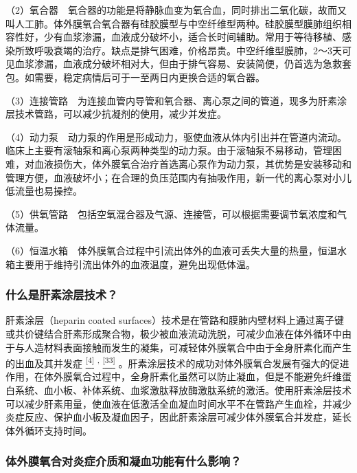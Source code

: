 （2）氧合器　氧合器的功能是将静脉血变为氧合血，同时排出二氧化碳，故而又叫人工肺。体外膜氧合氧合器有硅胶膜型与中空纤维型两种。硅胶膜型膜肺组织相容性好，少有血浆渗漏，血液成分破坏小，适合长时间辅助。常用于等待移植、感染所致呼吸衰竭的治疗。缺点是排气困难，价格昂贵。中空纤维型膜肺，2～3天可见血浆渗漏，血液成分破坏相对大，但由于排气容易、安装简便，仍首选为急救套包。如需要，稳定病情后可于一至两日内更换合适的氧合器。

（3）连接管路　为连接血管内导管和氧合器、离心泵之间的管道，现多为肝素涂层技术管路，可以减少抗凝剂的使用，减少并发症。

（4）动力泵　动力泵的作用是形成动力，驱使血液从体内引出并在管道内流动。临床上主要有滚轴泵和离心泵两种类型的动力泵。由于滚轴泵不易移动，管理困难，对血液损伤大，体外膜氧合治疗首选离心泵作为动力泵，其优势是安装移动和管理方便，血液破坏小；在合理的负压范围内有抽吸作用，新一代的离心泵对小儿低流量也易操控。

（5）供氧管路　包括空氧混合器及气源、连接管，可以根据需要调节氧浓度和气体流量。

（6）恒温水箱　体外膜氧合过程中引流出体外的血液可丢失大量的热量，恒温水箱主要用于维持引流出体外的血液温度，避免出现低体温。

\subsubsection{什么是肝素涂层技术？}

肝素涂层（heparin coated
surfaces）技术是在管路和膜肺内壁材料上通过离子键或共价键结合肝素形成聚合物，极少被血液流动洗脱，可减少血液在体外循环中由于与人造材料表面接触而发生的凝集，可减轻体外膜氧合中由于全身肝素化而产生的出血及其并发症
\protect\hyperlink{text00030.htmlux5cux23ch4-29}{\textsuperscript{{[}4{]}}}
\textsuperscript{,}
\protect\hyperlink{text00030.htmlux5cux23ch33-29}{\textsuperscript{{[}33{]}}}
。肝素涂层技术的成功对体外膜氧合发展有强大的促进作用，在体外膜氧合过程中，全身肝素化虽然可以防止凝血，但是不能避免纤维蛋白系统、血小板、补体系统、血浆激肽释放酶激肽系统的激活。使用肝素涂层技术可以减少肝素用量，使血液在低激活全血凝血时间水平不在管路产生血栓，并减少炎症反应、保护血小板及凝血因子，因此肝素涂层可减少体外膜氧合并发症，延长体外循环支持时间。

\subsubsection{体外膜氧合对炎症介质和凝血功能有什么影响？}

